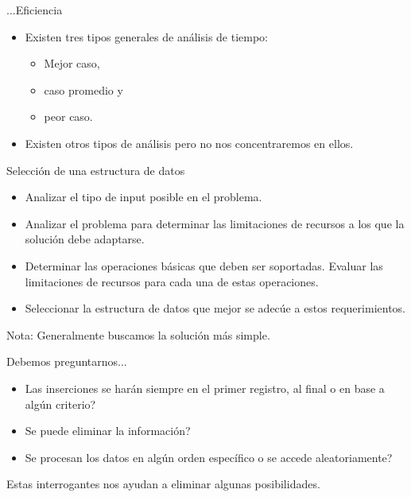 \documentclass[aspectratio=169]{beamer}
\begin{document}
\begin{frame}{...Eficiencia}
  \begin{itemize}
    \item Existen tres tipos generales de análisis de tiempo:
    \begin{itemize}
      \item Mejor caso,
      \item caso promedio y
      \item peor caso.
    \end{itemize}
    \item Existen otros tipos de análisis pero no nos concentraremos en ellos.
  \end{itemize}
\end{frame}

\begin{frame}{Selección de una estructura de datos}
  \begin{itemize}
    \item Analizar el tipo de input posible en el problema.
    \item Analizar el problema para determinar las limitaciones de recursos a los que la solución debe adaptarse.
    \item Determinar las operaciones básicas que deben ser soportadas. Evaluar las limitaciones de recursos para cada una de estas operaciones.
    \item Seleccionar la estructura de datos que mejor se adecúe a estos requerimientos.
  \end{itemize}
  Nota: Generalmente buscamos la solución más simple.
\end{frame}

\begin{frame}{Debemos preguntarnos...}
  \begin{itemize}
    \item Las inserciones se harán siempre en el primer registro, al final o en base a algún criterio?
    \item Se puede eliminar la información?
    \item Se procesan los datos en algún orden específico o se accede aleatoriamente?
  \end{itemize}
  Estas interrogantes nos ayudan a eliminar algunas posibilidades.
\end{frame}
\end{document}
